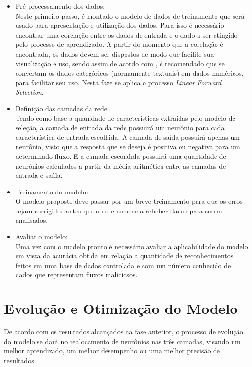     \begin{itemize}
        \item Pré-processamento dos dados: \\ Neste primeiro passo, é montado o modelo de dados de treinamento que será usado para apresentação e utilização dos dados. Para isso é necessário encontrar uma corelação entre os dados de entrada e o dado a ser atingido pelo processo de aprendizado. A partir do momento que a corelação é encontrada, os dados devem ser dispostos de modo que facilite sua visualização e uso, sendo assim de acordo com \cite{brink2015}, é recomendado que se convertam os dados categóricos (normamente textuais) em dados numéricos, para facilitar seu uso. Nesta faze se aplica o processo \textit{Linear Forward Selection}.

        \item Definição das camadas da rede: \\ Tendo como base a quanidade de características extraídas pelo modelo de seleção, a camada de entrada da rede possuirá um neurônio para cada característica de entrada escolhida. A camada de saída possuirá apenas um neurônio, visto que a resposta que se deseja é positiva ou negativa para um determinado fluxo. E a camada escondida possuirá uma quantidade de neurônios calculados a partir da média aritmética entre as camadas de entrada e saída.

        \item Treinamento do modelo: \\ O modelo proposto deve passar por um breve treinamento para que os erros sejam corrigidos antes que a rede comece a rebeber dados para serem analisados.

        \item Avaliar o modelo: \\ Uma vez com o modelo pronto é necessário avaliar a aplicabilidade do modelo em vista da acurácia obtida em relação a quantidade de reconhecimentos feitos em uma base de dados controlada e com um número conhecido de dados que representam fluxos maliciosos.

    \end{itemize}

\section{Evolução e Otimização do Modelo}
    De acordo com os resultados alcançados na fase anterior, o processo de evolução do modelo se dará no realocamento de neurônios nas três camadas, visando um melhor aprendizado, um melhor desempenho ou uma melhor precisão de resultados.







